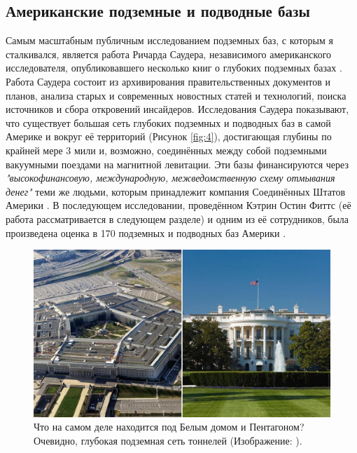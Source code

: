 \documentclass[10pt,twocolumn,letterpaper]{article}
\begin{document}
\subsection{Американские подземные и подводные базы}

Самым масштабным публичным исследованием подземных баз, с которым я сталкивался, является работа Ричарда Саудера, независимого американского исследователя, опубликовавшего несколько книг о глубоких подземных базах \cite{22}. Работа Саудера состоит из архивирования правительственных документов и планов, анализа старых и современных новостных статей и технологий, поиска источников и сбора откровений инсайдеров. Исследования Саудера показывают, что существует большая сеть глубоких подземных и подводных баз в самой Америке и вокруг её территорий (Рисунок \ref{fig:4}), достигающая глубины по крайней мере 3 мили и, возможно, соединённых между собой подземными вакуумными поездами на магнитной левитации. Эти базы финансируются через \textit{"высокофинансовую, международную, межведомственную схему отмывания денег"} теми же людьми, которым принадлежит компания Соединённых Штатов Америки \cite{22}. В последующем исследовании, проведённом Кэтрин Остин Фиттс (её работа рассматривается в следующем разделе) и одним из её сотрудников, была произведена оценка в 170 подземных и подводных баз Америки \cite{16,20}.

\begin{figure}[b]
\begin{center}
   \includegraphics[width=1\linewidth]{penta.jpg}
\end{center}
   \caption{Что на самом деле находится под Белым домом и Пентагоном? Очевидно, глубокая подземная сеть тоннелей (Изображение: \cite{31}).}
\label{fig:3}
\label{fig:onecol}
\end{figure}
\end{document}
